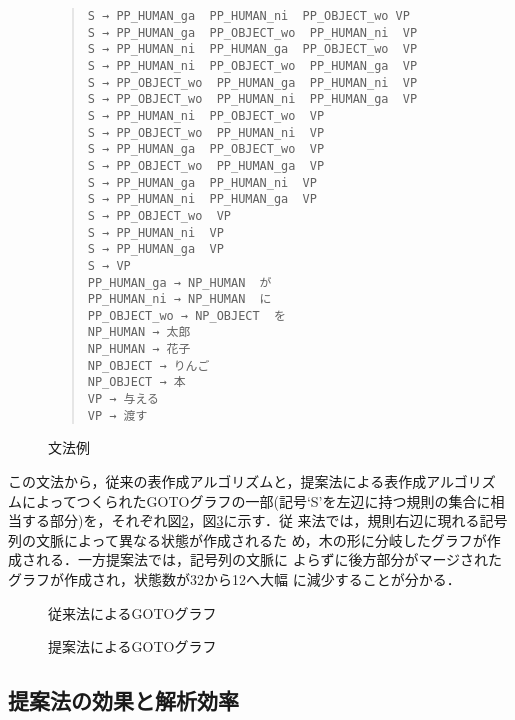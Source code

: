 \begin{figure}
\begin{quote}
\begin{verbatim}
S → PP_HUMAN_ga  PP_HUMAN_ni  PP_OBJECT_wo VP
S → PP_HUMAN_ga  PP_OBJECT_wo  PP_HUMAN_ni  VP
S → PP_HUMAN_ni  PP_HUMAN_ga  PP_OBJECT_wo  VP
S → PP_HUMAN_ni  PP_OBJECT_wo  PP_HUMAN_ga  VP
S → PP_OBJECT_wo  PP_HUMAN_ga  PP_HUMAN_ni  VP
S → PP_OBJECT_wo  PP_HUMAN_ni  PP_HUMAN_ga  VP
S → PP_HUMAN_ni  PP_OBJECT_wo  VP
S → PP_OBJECT_wo  PP_HUMAN_ni  VP
S → PP_HUMAN_ga  PP_OBJECT_wo  VP
S → PP_OBJECT_wo  PP_HUMAN_ga  VP
S → PP_HUMAN_ga  PP_HUMAN_ni  VP
S → PP_HUMAN_ni  PP_HUMAN_ga  VP
S → PP_OBJECT_wo  VP
S → PP_HUMAN_ni  VP
S → PP_HUMAN_ga  VP
S → VP
PP_HUMAN_ga → NP_HUMAN  が
PP_HUMAN_ni → NP_HUMAN  に
PP_OBJECT_wo → NP_OBJECT  を
NP_HUMAN → 太郎
NP_HUMAN → 花子
NP_OBJECT → りんご
NP_OBJECT → 本
VP → 与える
VP → 渡す
\end{verbatim}
\end{quote}
\caption{文法例}\label{fig:g_example}
\end{figure}

この文法から，従来の表作成アルゴリズムと，提案法による表作成アルゴリズ
ムによってつくられたGOTOグラフの一部(記号`S'を左辺に持つ規則の集合に相
当する部分)を，それぞれ図\ref{fig:goto}，図\ref{fig:r_goto}に示す．従
来法では，規則右辺に現れる記号列の文脈によって異なる状態が作成されるた
め，木の形に分岐したグラフが作成される．一方提案法では，記号列の文脈に
よらずに後方部分がマージされたグラフが作成され，状態数が32から12へ大幅
に減少することが分かる．

\begin{figure}
  \begin{center}
    \leavevmode

    \caption{従来法によるGOTOグラフ}
    \label{fig:goto}
  \end{center}
\end{figure}

\begin{figure}
  \begin{center}
    \leavevmode
    \caption{提案法によるGOTOグラフ}
    \label{fig:r_goto}
  \end{center}
\end{figure}


\subsection{提案法の効果と解析効率}
\label{ss:quality}

